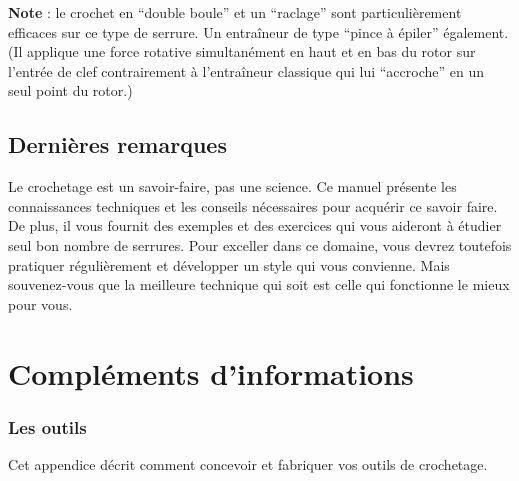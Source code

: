 \documentclass[a4paper,french,11pt,twoside]{report}
\begin{document}

\noindent \textbf{Note} : le crochet en \enquote{double boule} et un \enquote{raclage} sont particulièrement efficaces sur ce type de serrure.
Un entraîneur de type \enquote{pince à épiler} également. (Il applique une force rotative simultanément en haut et en bas du rotor sur l'entrée de clef contrairement à l'entraîneur classique qui lui \enquote{accroche} en un seul point du rotor.)

\section{Dernières remarques}

Le crochetage est un savoir-faire, pas une science. Ce manuel présente les connaissances techniques et les conseils nécessaires pour acquérir ce savoir faire. De plus, il vous fournit des exemples et des exercices qui vous aideront à étudier seul bon nombre de serrures. Pour exceller dans ce domaine, vous devrez toutefois pratiquer régulièrement et développer un style qui vous convienne. Mais souvenez-vous que la meilleure technique qui soit est celle qui fonctionne le mieux pour vous.

\chapter{Compléments d'informations}

\subsection{Les outils}
Cet appendice décrit comment concevoir et fabriquer vos outils de crochetage.
\end{document}
